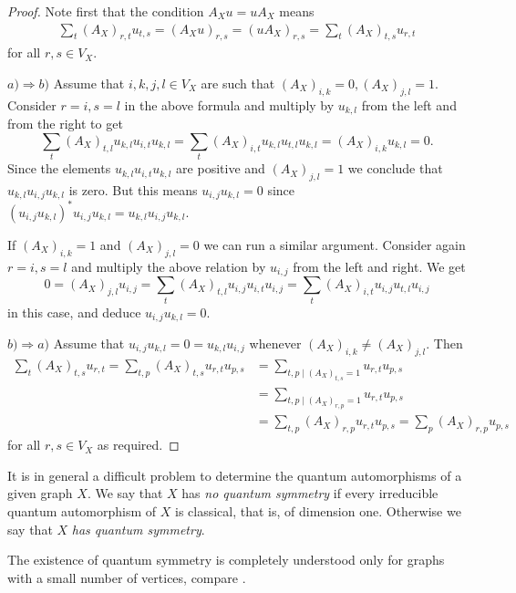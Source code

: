 \documentclass[a4paper]{amsart}
\numberwithin{equation}{section}
\theoremstyle{change}
\begin{document}
\begin{proof} 
Note first that the condition $ A_X u = u A_X $ means
\begin{align*}
\sum_t (A_X)_{r,t} u_{t,s} = (A_X u)_{r,s} = (u A_X)_{r,s} = \sum_t (A_X)_{t,s} u_{r,t}
\end{align*}
for all $ r,s \in V_X $. 

$ a) \Rightarrow b) $ Assume that $ i,k,j,l \in V_X $ are such that $ (A_X)_{i,k} = 0, (A_X)_{j,l} = 1 $. 
Consider $ r = i, s = l $ in the above formula and multiply by $ u_{k,l} $ from the left and from the right to get
$$
\sum_t (A_X)_{t,l} u_{k,l} u_{i,t} u_{k,l} = \sum_t (A_X)_{i,t} u_{k,l} u_{t,l} u_{k,l} = (A_X)_{i,k} u_{k,l} = 0.  
$$
Since the elements $ u_{k,l} u_{i,t} u_{k,l} $ are positive and $ (A_X)_{j,l} = 1 $ we conclude that $ u_{k,l} u_{i,j} u_{k,l} $ is zero. 
But this means $ u_{i,j} u_{k,l} = 0 $ since $ (u_{i,j} u_{k,l})^* u_{i,j} u_{k,l} = u_{k,l} u_{i,j} u_{k,l} $. 

If $ (A_X)_{i,k} = 1 $ and $ (A_X)_{j,l} = 0 $ we can run a similar argument. Consider again $ r = i, s = l $ and multiply the above relation by $ u_{i,j} $ 
from the left and right. We get 
$$
0 = (A_X)_{j,l} u_{i,j} = \sum_t (A_X)_{t,l} u_{i,j} u_{i,t} u_{i,j} = \sum_t (A_X)_{i,t} u_{i,j} u_{t,l} u_{i,j} 
$$
in this case, and deduce $ u_{i,j} u_{k,l} = 0 $. 

$ b) \Rightarrow a) $ Assume that $ u_{i,j} u_{k,l} = 0 = u_{k,l} u_{i,j} $ whenever $ (A_X)_{i,k} \neq (A_X)_{j,l} $. Then 
\begin{align*}
\sum_t (A_X)_{t,s} u_{r,t} = \sum_{t,p} (A_X)_{t,s} u_{r,t} u_{p,s} 
&= \sum_{t,p \mid (A_X)_{t,s} = 1} u_{r,t} u_{p,s} \\
&= \sum_{t, p \mid (A_X)_{r,p} = 1} u_{r,t} u_{p,s} \\
&= \sum_{t, p} (A_X)_{r,p} u_{r,t} u_{p,s} = \sum_p (A_X)_{r,p} u_{p,s} 
\end{align*}
for all $ r,s \in V_X $ as required. 
\end{proof} 

It is in general a difficult problem to determine the quantum automorphisms of a given graph $ X $. We say that $ X $ has \emph{no quantum symmetry} if every 
irreducible quantum automorphism of $ X $ is classical, that is, of dimension one. Otherwise we say that $ X $ \emph{has quantum symmetry}.

The existence of quantum symmetry is completely understood only for graphs with a small number of vertices, compare \cite{BANICA_BICHON_ordereleven}.  
\end{document}
